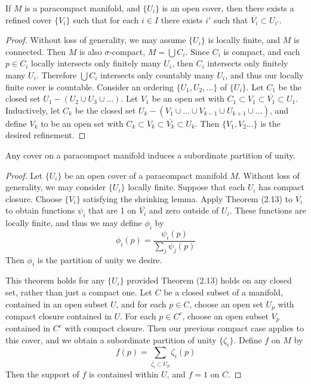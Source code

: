 \begin{lemma}
    If $M$ is a paracompact manifold, and $\{ U_i \}$ is an open cover, then there exists a refined cover $\{ V_i \}$ such that for each $i \in I$ there exists $i'$ such that $\overline{V_i} \subset U_{i'}$.
\end{lemma}
\begin{proof}
    Without loss of generality, we may assume $\{ U_i \}$ is locally finite, and $M$ is connected. Then $M$ is also $\sigma$-compact, $M = \bigcup C_i$. Since $C_i$ is compact, and each $p \in C_i$ locally intersects only finitely many $U_i$, then $C_i$ intersects only finitely many $U_i$. Therefore $\bigcup C_i$ intersects only countably many $U_i$, and thus our locally finite cover is countable. Consider an ordering $\{ U_1, U_2, \dots \}$ of $\{ U_i \}$. Let $C_1$ be the closed set $U_1 - (U_2 \cup U_3 \cup \dots)$. Let $V_1$ be an open set with $C_1 \subset V_1 \subset \overline{V_1} \subset U_1$. Inductively, let $C_k$ be the closed set $U_k - (V_1 \cup \dots \cup V_{k-1} \cup U_{k+1} \cup \dots)$, and define $V_k$ to be an open set with $C_k \subset V_k \subset \overline{V_k} \subset U_k$. Then $\{ V_1, V_2 \dots \}$ is the desired refinement.
\end{proof}

\begin{theorem}
    Any cover on a paracompact manifold induces a subordinate partition of unity.
\end{theorem}
\begin{proof}
    Let $\{ U_i \}$ be an open cover of a paracompact manifold $M$. Without loss of generality, we may consider $\{ U_i \}$ locally finite. Suppose that each $U_i$ has compact closure. Choose $\{ V_i \}$ satisfying the shrinking lemma. Apply Theorem (2.13) to $\overline{V_i}$ to obtain functions $\psi_i$ that are 1 on $\overline{V_i}$ and zero outside of $U_i$. These functions are locally finite, and thus we may define $\phi_i$ by
    \[ \phi_i(p) = \frac{\psi_i(p)}{\sum_j \psi_j(p)} \]
    Then $\phi_i$ is the partition of unity we desire.

    This theorem holds for any $\{ U_i \}$ provided Theorem (2.13) holds on any closed set, rather than just a compact one. Let $C$ be a closed subset of a manifold, contained in an open subset $U$, and for each $p \in C$, choose an open set $U_p$ with compact closure contained in $U$. For each $p \in C^c$, choose an open subset $V_p$ contained in $C^c$ with compact closure. Then our previous compact case applies to this cover, and we obtain a subordinate partition of unity $\{ \zeta_i \}$. Define $f$ on $M$ by
    \[ f(p) = \sum_{\overline{\zeta_i} \subset U_p} \zeta_i(p) \]
    Then the support of $f$ is contained within $U$, and $f = 1$ on $C$.
\end{proof}

